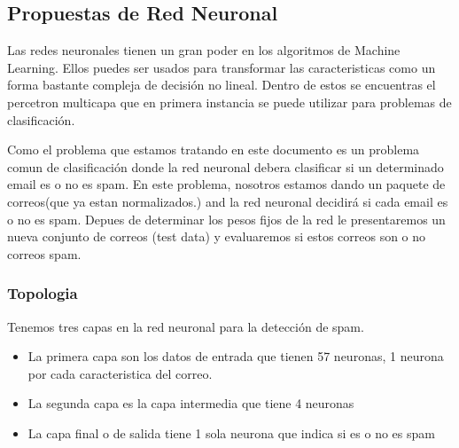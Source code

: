 \documentclass[12pt]{article}
\begin{document}
\subsection{Propuestas de Red Neuronal}
Las redes neuronales tienen un gran poder en los algoritmos de Machine Learning. Ellos puedes ser usados para transformar las caracteristicas como un forma bastante compleja de decisión no lineal. Dentro de estos se encuentras el percetron multicapa que en primera instancia se puede utilizar para problemas de clasificación.

Como el problema que estamos tratando en este documento es un problema comun de clasificación donde la red neuronal debera clasificar si un determinado email es o no es spam. En este problema, nosotros estamos dando un paquete de correos(que ya estan normalizados.) and la red neuronal decidirá si cada email es o no es spam. Depues de determinar los pesos fijos de la red le presentaremos  un nueva conjunto de correos (test data) y evaluaremos si estos correos son o no  correos spam.
\subsubsection{Topologia}
Tenemos tres capas en la red neuronal para la detección de spam.
\begin{itemize}
\item La primera capa son los datos de entrada que tienen 57 neuronas, 1 neurona por cada caracteristica del correo.

\item La segunda capa es la capa intermedia que tiene 4 neuronas

\item La capa final o de salida tiene 1 sola neurona que indica si es o no es spam
\end{itemize}
\clearpage
\end{document}
